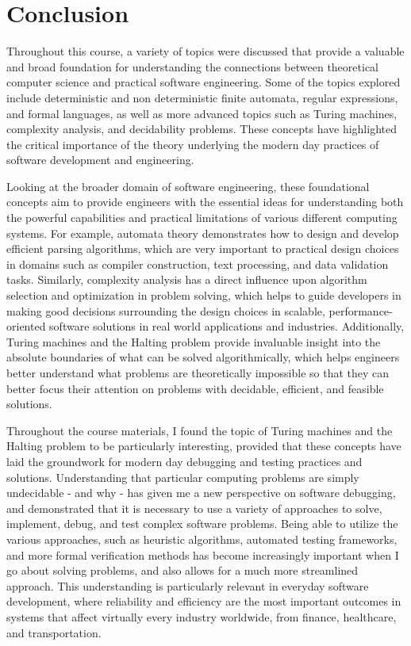 \documentclass{article}
\theoremstyle{theorem}
\theoremstyle{definition}
\theoremstyle{remark}
\begin{document}
\newpage
\section{Conclusion}\label{conclusion}

Throughout this course, a variety of topics were discussed that provide a valuable and broad foundation for understanding the connections between theoretical computer science and practical software engineering. Some of the topics explored include deterministic and non deterministic finite automata, regular expressions, and formal languages, as well as more advanced topics such as Turing machines, complexity analysis, and decidability problems. These concepts have highlighted the critical importance of the theory underlying the modern day practices of software development and engineering.

Looking at the broader domain of software engineering, these foundational concepts aim to provide engineers with the essential ideas for understanding both the powerful capabilities and practical limitations of various different computing systems. For example, automata theory demonstrates how to design and develop efficient parsing algorithms, which are very important to practical design choices in domains such as compiler construction, text processing, and data validation tasks. Similarly, complexity analysis has a direct influence upon algorithm selection and optimization in problem solving, which helps to guide developers in making good decisions surrounding the design choices in scalable, performance-oriented software solutions in real world applications and industries. Additionally, Turing machines and the Halting problem provide invaluable insight into the absolute boundaries of what can be solved algorithmically, which helps engineers better understand what problems are theoretically impossible so that they can better focus their attention on problems with decidable, efficient, and feasible solutions.

Throughout the course materials, I found the topic of Turing machines and the Halting problem to be particularly interesting, provided that these concepts have laid the groundwork for modern day debugging and testing practices and solutions. Understanding that particular computing problems are simply undecidable - and why - has given me a new perspective on software debugging, and demonstrated that it is necessary to use a variety of approaches to solve, implement, debug, and test complex software problems. Being able to utilize the various approaches, such as heuristic algorithms, automated testing frameworks, and more formal verification methods has become increasingly important when I go about solving problems, and also allows for a much more streamlined approach. This understanding is particularly relevant in everyday software development, where reliability and efficiency are the most important outcomes in systems that affect virtually every industry worldwide, from finance, healthcare, and transportation. 
\end{document}
